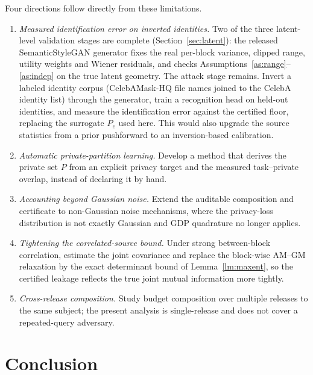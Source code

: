 \documentclass[10pt,twocolumn,letterpaper]{article}
\theoremstyle{plain}
\theoremstyle{definition}
\begin{document}
Four directions follow directly from these limitations.

\begin{enumerate}
\item[(F1)] \emph{Measured identification error on inverted identities.} Two of the three latent-level validation stages are complete
(Section~\ref{sec:latent}): the released SemanticStyleGAN generator fixes the real per-block
variance, clipped range, utility weights and Wiener residuals, and checks
Assumptions~\ref{as:range}--\ref{as:indep} on the true latent geometry. The attack stage remains. Invert a
labeled identity corpus (CelebAMask-HQ file names joined to the CelebA identity list)
through the generator, train a recognition head on held-out identities, and measure the
identification error against the certified floor, replacing the surrogate $P_e$ used here.
This would also upgrade the source statistics from a prior pushforward to an
inversion-based calibration. \item[(F2)] \emph{Automatic private-partition learning.} Develop a method that derives the private
set $P$ from an explicit privacy target and the measured task--private overlap, instead
of declaring it by hand. \item[(F3)] \emph{Accounting beyond Gaussian noise.} Extend the auditable composition and
certificate to non-Gaussian noise mechanisms, where the privacy-loss distribution is not
exactly Gaussian and GDP quadrature no longer applies. \item[(F4)] \emph{Tightening the correlated-source bound.} Under strong
between-block correlation, estimate the joint covariance and replace the block-wise
AM--GM relaxation by the exact determinant bound of Lemma~\ref{lm:maxent}, so the certified leakage
reflects the true joint mutual information more tightly. \item[(F5)] \emph{Cross-release composition.} Study budget
composition over multiple releases to the same subject; the present analysis is
single-release and does not cover a repeated-query adversary.
\end{enumerate}

\section{Conclusion}
\label{sec:conclusion}
\end{document}
